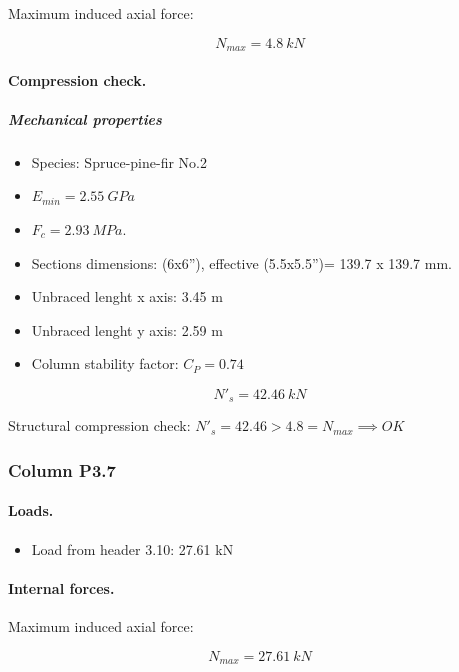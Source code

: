 \noindent Maximum induced axial force:

\begin{equation}
  N_{max}= 4.8\ kN
\end{equation}

\paragraph{Compression check.}

\subparagraph{Mechanical properties}

\begin{itemize}
\item Species: Spruce-pine-fir No.2
\item $E_{min}= 2.55\ GPa$
\item $F_c= 2.93\ MPa$.
\item Sections dimensions: (6x6''), effective (5.5x5.5'')= 139.7 x 139.7  mm.
\item Unbraced lenght x axis: 3.45 m
\item Unbraced lenght y axis: 2.59 m
\item Column stability factor: $C_P= 0.74$
\end{itemize}

\begin{equation}
  N'_s= 42.46\ kN
\end{equation}

\noindent Structural compression check: $N'_s = 42.46 > 4.8 = N_{max} \implies OK$

\subsubsection{Column P3.7}

\paragraph{Loads.}

\begin{itemize}
\item Load from header 3.10: 27.61 kN
\end{itemize}

\paragraph{Internal forces.}

\noindent Maximum induced axial force:

\begin{equation}
  N_{max}= 27.61\ kN
\end{equation}

